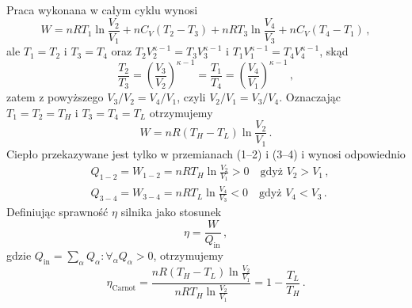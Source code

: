 \documentclass[../main.tex]{subfiles}
\begin{document}
\noindent Praca wykonana w całym cyklu wynosi
\begin{equation*}
    W=nRT_1\ln\frac{V_2}{V_1}+nC_V(T_2-T_3)+nRT_3\ln\frac{V_4}{V_3}+nC_V(T_4-T_1)\,,
\end{equation*}
ale \(T_1=T_2\) i \(T_3=T_4\) oraz \(T_2V_2^{\kappa -1}=T_3V_3^{\kappa-1}\) i
\(T_1V_1^{\kappa-1}=T_4V_4^{\kappa-1}\), skąd
\begin{equation*}
    \frac{T_2}{T_3}=\left(\frac{V_3}{V_2}\right)^{\kappa-1}=\frac{T_1}{T_4}=\left(\frac{V_4}{V_1}\right)^{\kappa-1}\,,
\end{equation*}
zatem z powyższego \(V_3/V_2=V_4/V_1\), czyli \(V_2/V_1=V_3/V_4\). Oznaczając \(T_1=T_2=T_H\) i
\(T_3=T_4=T_L\) otrzymujemy
\begin{equation*}
    W=nR(T_H-T_L)\ln\frac{V_2}{V_1}\,.
\end{equation*}
Ciepło przekazywane jest tylko w przemianach (1--2) i (3--4) i wynosi odpowiednio
\begin{equation*}
\begin{split}
    &Q_{1-2}=W_{1-2}=nRT_H\ln\frac{V_2}{V_1}>0\quad\text{gdyż \(V_2>V_1\)}\,,\\
    &Q_{3-4}=W_{3-4}=nRT_L\ln\frac{V_4}{V_3}<0\quad\text{gdyż \(V_4<V_3\)}\,.
\end{split}
\end{equation*}
Definiując sprawność \(\eta\) silnika jako stosunek
\begin{equation*}
    \eta=\frac{W}{Q_\text{in}}\,,
\end{equation*}
gdzie \(Q_\text{in}=\sum_\alpha Q_\alpha : \forall_\alpha Q_\alpha >0\), otrzymujemy
\begin{equation*}
    \eta_\text{Carnot}=\frac{nR(T_H-T_L)\ln\frac{V_2}{V_1}}{nRT_H\ln\frac{V_2}{V_1}}=1-\frac{T_L}{T_H}\,.
\end{equation*}
\noindent{}
\medskip
\end{document}
